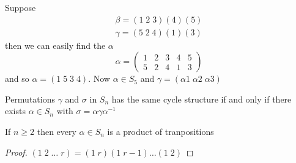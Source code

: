 \documentclass[11pt]{article}
\begin{document}
\begin{examplle}[]
\label{example2.8}
Suppose
\begin{gather*}
\beta=(1\;2\;3)(4)(5)\\
\gamma=(5\;2\;4)(1)(3)
\end{gather*}
then we can easily find the \(\alpha\)
\begin{equation*}
\alpha=
\begin{pmatrix}
1&2&3&4&5\\
5&2&4&1&3
\end{pmatrix}
\end{equation*}
and so \(\alpha=(1\;5\;3\;4)\). Now \(\alpha\in S_5\) and \(\gamma=(\alpha 1\;\alpha
   2\;\alpha 3)\)
\end{examplle}
\begin{theorem}[]
Permutations \(\gamma\) and \(\sigma\) in \(S_n\) has the same cycle structure if
and only if there exists \(\alpha\in S_n\) with \(\sigma=\alpha\gamma\alpha^{-1}\)
\end{theorem}


\begin{proposition}[]
If \(n\ge 2\) then every \(\alpha\in S_n\) is a product of tranpositions
\end{proposition}
\begin{proof}
\((1\;2\;\dots\; r)=(1\; r)(1\; r-1)\dots(1\; 2)\)
\end{proof}
\end{document}
